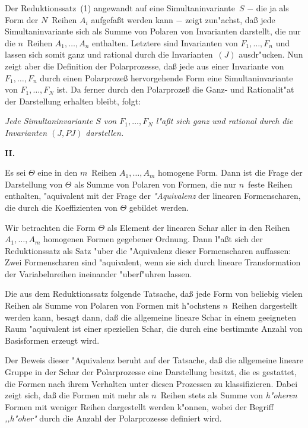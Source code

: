 \documentclass[11pt,a4paper]{article}
\begin{document}
Der Reduktionssatz~(1) angewandt auf eine Simultaninvariante~$S$
$-$ die ja als Form der $N$~Reihen $A_{i}$ aufgefa\ss{}t werden kann $-$
zeigt zun"{a}chst, da\ss{} jede Simultaninvariante sich als Summe von Polaren
von Invarianten darstellt, die nur die $n$~Reihen $A_{1},\dots,A_{n}$
enthalten. Letztere sind Invarianten von $F_{1},\dots,F_{n}$ und lassen sich
somit ganz und rational durch die Invarianten~$(J)$ ausdr"{u}cken. Nun
zeigt aber die Definition der Polarprozesse, da\ss{} jede aus einer Invariante
von $F_{1},\dots,F_{n}$ durch einen Polarproze\ss{} hervorgehende Form eine
Simultaninvariante von $F_{1},\dots,F_{N}$ ist. Da ferner durch den
Polarproze\ss{} die Ganz- und Rationalit"{a}t der Darstellung erhalten bleibt,
folgt:

\smallskip
\emph{Jede Simultaninvariante $S$ von $F_{1},\dots,F_{N}$ l"{a}\ss{}t sich ganz
und rational durch die Invarianten $(J,PJ)$ darstellen.}

\medskip
\noindent
\textbf{II.}

Es sei $\Theta$ eine in den $m$~Reihen $A_{1},\dots,A_{m}$ homogene Form.
Dann ist die Frage der Darstellung von $\Theta$ als Summe von Polaren
von Formen, die nur $n$~feste Reihen enthalten, "{a}quivalent mit der Frage
der \emph{"{A}quivalenz} der linearen Formenscharen, die durch die Koeffizienten
von $\Theta$ gebildet werden.

Wir betrachten die Form $\Theta$ als Element der linearen Schar aller
in den Reihen $A_{1},\dots,A_{m}$ homogenen Formen gegebener Ordnung.
Dann l"{a}\ss{}t sich der Reduktionssatz als Satz "{u}ber die "{A}quivalenz dieser
Formenscharen auffassen: Zwei Formenscharen sind "{a}quivalent, wenn sie
sich durch lineare Transformation der Variabelnreihen ineinander
"{u}berf"{u}hren lassen.

Die aus dem Reduktionssatz folgende Tatsache, da\ss{} jede Form von
beliebig vielen Reihen als Summe von Polaren von Formen mit h"{o}chstens
$n$~Reihen dargestellt werden kann, besagt dann, da\ss{} die allgemeine
lineare Schar in einem geeigneten Raum "{a}quivalent ist einer speziellen
Schar, die durch eine bestimmte Anzahl von Basisformen erzeugt wird.

Der Beweis dieser "{A}quivalenz beruht auf der Tatsache, da\ss{} die
allgemeine lineare Gruppe in der Schar der Polarprozesse eine
Darstellung besitzt, die es gestattet, die Formen nach ihrem Verhalten
unter diesen Prozessen zu klassifizieren. Dabei zeigt sich, da\ss{} die
Formen mit mehr als $n$~Reihen stets als Summe von \emph{h"{o}heren} Formen
mit weniger Reihen dargestellt werden k"{o}nnen, wobei der Begriff
\emph{,,h"{o}her"{}} durch die Anzahl der Polarprozesse definiert wird.
\end{document}

